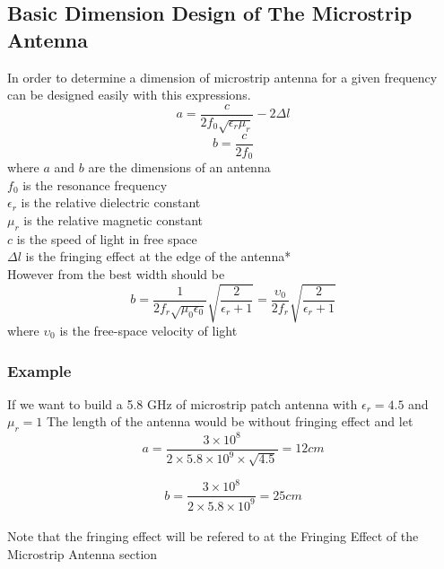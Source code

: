 \documentclass[11pt,a4paper,hidelinks]{article}
\begin{document}
  \newpage

    \subsection{Basic Dimension Design of The Microstrip Antenna}
      \indent In order to determine a dimension of microstrip antenna for a given frequency can be designed
              easily with this expressions\cite{NoK:05}.
      \begin{equation}
        a = \frac{c}{2f_0\sqrt{\epsilon_r\mu_r}} - 2\Delta l 
      \end{equation}
      \begin{equation}
        b = \frac{c}{2f_0}
      \end{equation}
      \indent where $a$ and $b$ are the dimensions of an antenna\\[1ex]
      \indent $f_0$ is the resonance frequency\\[1ex]
      \indent $\epsilon_r$ is the relative dielectric constant\\[1ex]
      \indent $\mu_r$ is the relative magnetic constant\\[1ex]
      \indent $c$ is the speed of light in free space\\[1ex]
      \indent $\Delta l$ is the fringing effect at the edge of the antenna*\\[3ex]
      \indent However from \cite{CoB:05} the best width should be
      \begin{equation}
        b = \frac {1} {2 f_r \sqrt{\mu_{0} \epsilon_{0}}}\sqrt{\frac{2}{\epsilon_{r} + 1}} = \frac{\upsilon_{0}}{2f_{r}}\sqrt{\frac{2}{\epsilon_{r} + 1}}
      \end{equation}
      \indent where $\upsilon_{0}$ is the free-space velocity of light
      
      \subsubsection{Example}
        \indent If we want to build a 5.8 GHz of microstrip patch antenna with $\epsilon_{r}  = 4.5$ and $\mu_{r} = 1$
        \indent The length of the antenna would be without fringing effect and let 
        \begin{equation}
          a = \frac{3 \times 10^8}{2 \times 5.8 \times 10^9 \times \sqrt{4.5}} = 12 cm
        \end{equation}

        \begin{equation}
          b = \frac{3 \times 10^8}{2 \times 5.8 \times 10^9} = 25 cm
        \end{equation}
      \indent \\[7ex]
      \indent *Note that the fringing effect will be refered to at the Fringing Effect of the Microstrip Antenna section
      
\end{document}
